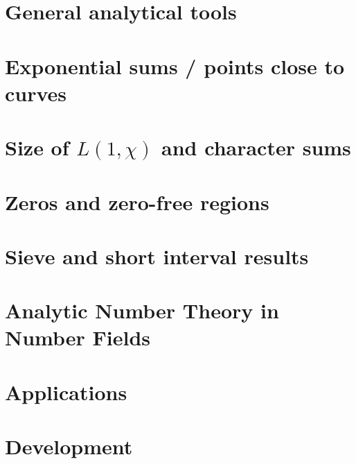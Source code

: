 \documentclass[10pt,twoside, svgnames]{book}
\begin{document}




\part{General analytical tools}





\part{Exponential sums / points close to curves}






\part{Size of $L(1,\chi)$ and character sums }




\part{Zeros and zero-free regions}




\part{Sieve and short interval results }




\part{Analytic Number Theory in Number Fields}



\part{Applications}




\part{Development}
\end{document}
